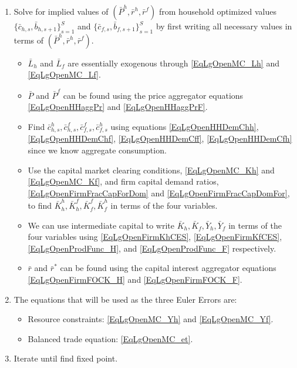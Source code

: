 \documentclass[letterpaper,12pt]{article}
\theoremstyle{definition}
\begin{document}
\begin{enumerate}
      \item Solve for implied values of $\left(\bar{P}^h, \bar{r}^h, \bar{r}^f\right)$ from household optimized values $\{\bar{c}_{h,s},\bar{b}_{h,s+1}\}_{s=1}^S$ and $\{\bar{c}_{f,s},\bar{b}_{f,s+1}\}_{s=1}^S$ by first writing all necessary values in terms of $\left(\bar{P}^h, \bar{r}^h, \bar{r}^f\right)$.
      \begin{itemize}
        \item $\bar{L}_h$ and $\bar{L}_f$ are essentially exogenous through \eqref{EqLgOpenMC_Lh} and \eqref{EqLgOpenMC_Lf}.
        \item $\bar{P}$ and $\bar{P}^f$ can be found using the price aggregator equations \eqref{EqLgOpenHHaggPr} and \eqref{EqLgOpenHHaggPrF}.
        \item Find $\bar{c}_{h,s}^h, \bar{c}_{h,s}^f, \bar{c}_{f,s}^f, \bar{c}_{f,s}^h$ using equations \eqref{EqLgOpenHHDemChh}, \eqref{EqLgOpenHHDemChf}, \eqref{EqLgOpenHHDemCff}, \eqref{EqLgOpenHHDemCfh} since we know aggregate consumption.
        \item Use the capital market clearing conditions, \eqref{EqLgOpenMC_Kh} and \eqref{EqLgOpenMC_Kf}, and firm capital demand ratios,  \eqref{EqLgOpenFirmFracCapForDom} and \eqref{EqLgOpenFirmFracCapDomFor}, to find $\bar{K}_h^h, \bar{K}_h^f, \bar{K}_f^f, \bar{K}_f^h$ in terms of the four variables.
        \item We can use intermediate capital to write $\bar{K}_h, \bar{K}_f, \bar{Y}_h, \bar{Y}_f$ in terms of the four variables using \eqref{EqLgOpenFirmKhCES}, \eqref{EqLgOpenFirmKfCES}, \eqref{EqLgOpenProdFunc_H}, and \eqref{EqLgOpenProdFunc_F} respectively.
        \item $\bar{r}$ and $\bar{r}^*$ can be found using the capital interest aggregator equations \eqref{EqLgOpenFirmFOCK_H} and \eqref{EqLgOpenFirmFOCK_F}.
      \end{itemize}
      \item The equations that will be used as the three Euler Errors are:
      \begin{itemize}
        \item Resource constraints: \eqref{EqLgOpenMC_Yh} and \eqref{EqLgOpenMC_Yf}.
        \item Balanced trade equation: \eqref{EqLgOpenMC_et}.
      \end{itemize}
      \item Iterate until find fixed point.
    \end{enumerate}
\end{document}
